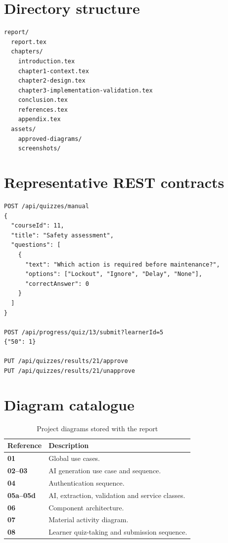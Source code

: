 \section{Directory structure}
\begin{lstlisting}
report/
  report.tex
  chapters/
    introduction.tex
    chapter1-context.tex
    chapter2-design.tex
    chapter3-implementation-validation.tex
    conclusion.tex
    references.tex
    appendix.tex
  assets/
    approved-diagrams/
    screenshots/
\end{lstlisting}

\section{Representative REST contracts}
\begin{lstlisting}
POST /api/quizzes/manual
{
  "courseId": 11,
  "title": "Safety assessment",
  "questions": [
    {
      "text": "Which action is required before maintenance?",
      "options": ["Lockout", "Ignore", "Delay", "None"],
      "correctAnswer": 0
    }
  ]
}

POST /api/progress/quiz/13/submit?learnerId=5
{"50": 1}

PUT /api/quizzes/results/21/approve
PUT /api/quizzes/results/21/unapprove
\end{lstlisting}

\section{Diagram catalogue}
\begin{table}[H]\centering\small
\caption{Project diagrams stored with the report}
\begin{tabularx}{\textwidth}{>{\bfseries}p{}X}
\toprule Reference & Description\\\midrule
01 & Global use cases.\\
02--03 & AI generation use case and sequence.\\
04 & Authentication sequence.\\
05a--05d & AI, extraction, validation and service classes.\\
06 & Component architecture.\\
07 & Material activity diagram.\\
08 & Learner quiz-taking and submission sequence.\\

\bottomrule
\end{tabularx}
\end{table}
